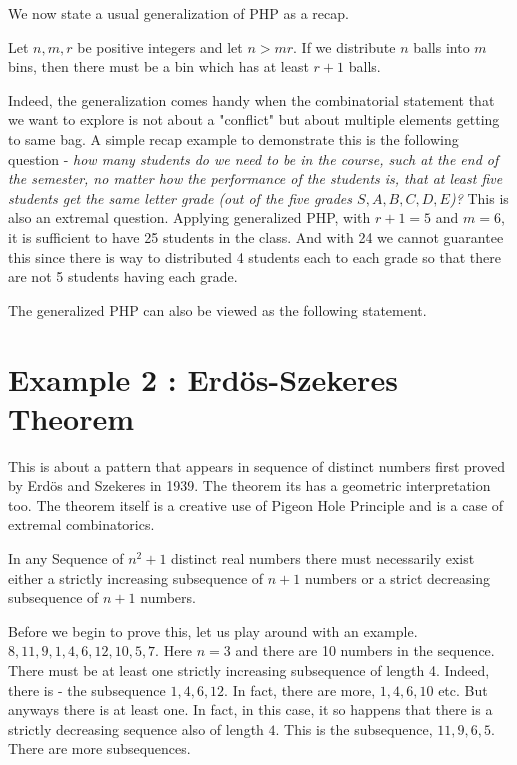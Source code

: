 We now state a usual generalization of PHP as a recap.

\begin{theorem}
Let $n,m ,r$ be positive integers and let $n > mr$. If we distribute $n$ balls into $m$ bins, then there must be a bin which has at least $r+1$ balls.
\end{theorem}

Indeed, the generalization comes handy when the combinatorial statement that we want to explore is not about a "conflict" but about multiple elements getting to same bag. A simple recap example to demonstrate this is the following question - {\em how many students do we need to be in the course, such at the end of the semester, no matter how the performance of the students is, that at least five students get the same letter grade (out of the five grades $S,A,B,C,D,E$)?} This is also an extremal question. Applying generalized PHP, with $r+1 = 5$ and $m=6$, it is sufficient to have 25 students in the class.  And with 24 we cannot guarantee this since there is way to distributed 4 students each to each grade so that there are not 5 students having each grade.

\begin{curiosity}
The generalized PHP can also be viewed as the following statement.
\end{curiosity}

\section{Example 2 : Erd\"os-Szekeres Theorem}

This is about a pattern that appears in sequence of distinct numbers first proved by Erd\"os and Szekeres in 1939. The theorem its has a geometric interpretation too. The theorem itself is a creative use of Pigeon Hole Principle and is a case of extremal combinatorics.

\begin{theorem}
In any Sequence of $n^2+1$ distinct real numbers there must necessarily exist either a strictly increasing subsequence  of $n+1$ numbers  or a strict decreasing subsequence of $n+1$ numbers.
\end{theorem}
Before we begin to prove this, let us play around with an example.
$8, 11, 9, 1, 4, 6, 12, 10, 5, 7$. Here $n=3$ and there are 10 numbers in the sequence. There must be at least one strictly increasing subsequence of length 4. Indeed, there is - the subsequence $1,4,6,12$. In fact, there are more, $1,4,6,10$ etc. But anyways there is at least one. In fact, in this case, it so happens that there is a strictly decreasing sequence also of length $4$. This is the subsequence, $11, 9, 6, 5$. There are more subsequences.

